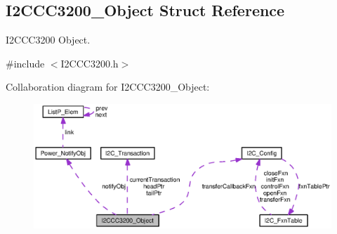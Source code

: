 \subsection{I2\+C\+C\+C3200\+\_\+\+Object Struct Reference}
\label{struct_i2_c_c_c3200___object}


I2\+C\+C\+C3200 Object.  




{\ttfamily \#include $<$I2\+C\+C\+C3200.\+h$>$}



Collaboration diagram for I2\+C\+C\+C3200\+\_\+\+Object\+:
\nopagebreak
\begin{figure}[H]
\begin{center}
\leavevmode
\includegraphics[width=350pt]{struct_i2_c_c_c3200___object__coll__graph}
\end{center}
\end{figure}
